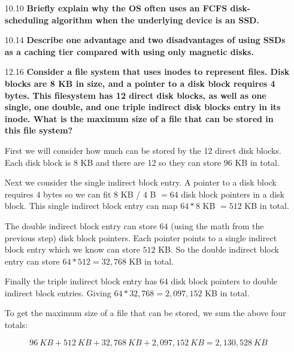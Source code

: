 \documentclass[11pt, letterpaper]{hw}
\begin{document}
\begin{enumerate}
\item [10.10] \textbf{Briefly explain why the OS often uses an FCFS disk-scheduling algorithm when the underlying device is an SSD.}

\item [10.14] \textbf{Describe one advantage and two disadvantages of using SSDs as a caching tier compared with using only magnetic disks.}
 
\item [12.16] \textbf{Consider a file system that uses inodes to represent files. Disk blocks are 8 KB in size, and a pointer to a disk block requires 4 bytes. This filesystem has 12 direct disk blocks, as well as one single, one double, and one triple indirect disk blocks entry in its inode. What is the maximum size of a file that can be stored in this file system?}

First we will consider how much can be stored by the 12 direct disk blocks. Each disk block is $8$ KB and there are 12 so they can store $96$ KB in total.

Next we consider the single indirect block entry. A pointer to a disk block requires $4$ bytes so we can fit $8$ KB / $4$ B $= 64$ disk block pointers in a disk block. This single indirect block entry can map $64 * 8$ KB $= 512$ KB in total.

The double indirect block entry can store $64$ (using the math from the previous step) disk block pointers. Each pointer points to a single indirect block entry which we know can store $512$ KB. So the double indirect block entry can store $64 * 512 = 32,768$ KB in total.

Finally the triple indirect block entry has $64$ disk block pointers to double indirect block entries. Giving $64 * 32,768 = 2,097,152$ KB in total.

To get the maximum size of a file that can be stored, we sum the above four totals:

$$96 \ KB + 512 \ KB + 32,768 \ KB + 2,097,152 \ KB = \boxed{2,130,528 \ KB}$$
\end{enumerate}
\end{document}
